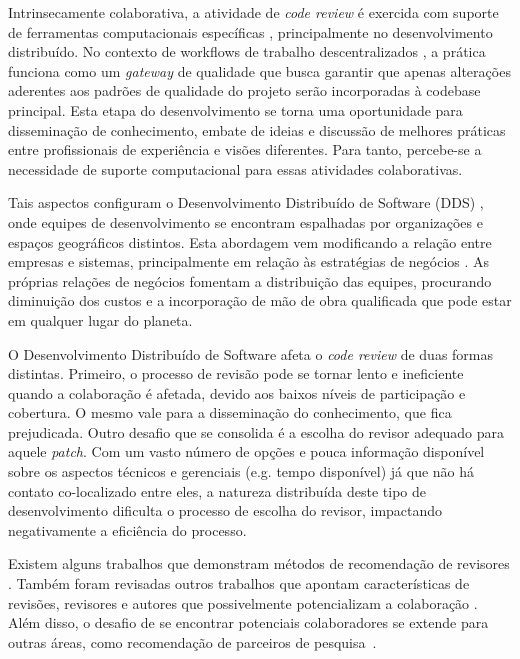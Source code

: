 \documentclass[sigconf]{acmart}
\begin{document}
Intrinsecamente colaborativa, a atividade de \textit{code review} é exercida com suporte de ferramentas computacionais específicas \cite{Bacchelli2013}, principalmente no desenvolvimento distribuído. No contexto de workflows de trabalho descentralizados \cite{gousios2016}, a prática funciona como um \textit{gateway} de qualidade que busca garantir que apenas alterações aderentes aos padrões de qualidade do projeto serão incorporadas à codebase principal. Esta etapa do desenvolvimento se torna uma oportunidade para disseminação de conhecimento, embate de ideias e discussão de melhores práticas entre profissionais de experiência e visões diferentes. Para tanto, percebe-se a necessidade de suporte computacional para essas atividades colaborativas.

Tais aspectos configuram o Desenvolvimento Distribuído de Software (DDS) \cite{herbsleb2003}, onde equipes de desenvolvimento se encontram espalhadas por organizações e espaços geográficos distintos. Esta abordagem vem modificando a relação entre empresas e sistemas, principalmente em relação às estratégias de negócios \cite{audy2007}. As próprias relações de negócios fomentam a distribuição das equipes, procurando diminuição dos custos e a incorporação de mão de obra qualificada que pode estar em qualquer lugar do planeta.


O Desenvolvimento Distribuído de Software afeta o \textit{code review} de duas formas distintas. Primeiro, o processo de revisão pode se tornar lento e ineficiente quando a colaboração é afetada, devido aos baixos níveis de participação e cobertura. O mesmo vale para a disseminação do conhecimento, que fica prejudicada. Outro desafio que se consolida é a escolha do revisor adequado para aquele \textit{patch}. Com um vasto número de opções e pouca informação disponível sobre os aspectos técnicos e gerenciais (e.g. tempo disponível) já que não há contato co-localizado entre eles, a natureza distribuída deste tipo de desenvolvimento dificulta o processo de escolha do revisor, impactando negativamente a eficiência do processo.

 Existem alguns trabalhos que demonstram métodos de recomendação de revisores \cite{yu2014,Xia2015261,jiang2017}. Também foram revisadas outros trabalhos que apontam características de revisões, revisores e autores que possivelmente potencializam a colaboração \cite{Kemerer2009,Bird2015191,Baysal2013122}. Além disso, o desafio de se encontrar potenciais colaboradores se extende para outras áreas, como recomendação de parceiros de pesquisa~\cite{digiampietri2015}.
\end{document}
